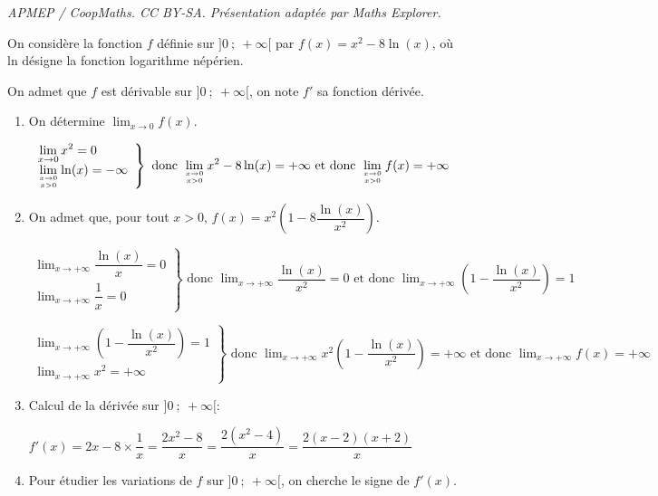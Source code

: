 \documentclass[10pt]{article}
\providecommand{\ds}{\displaystyle}
\begin{document}
\noindent\textit{APMEP / CoopMaths. CC BY-SA. Présentation adaptée par Maths Explorer.}\par\medskip
\medskip

On considère la fonction $f$ définie sur $]0~;~+\infty[$ par 
$f(x) = x^2 - 8\ln (x)$,
où ln désigne la fonction logarithme népérien.

On admet que $f$ est dérivable sur $]0~;~+\infty[$, on note $f'$ sa fonction dérivée. 

\medskip

\begin{enumerate}
\item On détermine $\displaystyle\lim_{x \to 0} f(x)$.

$\left .
\begin{array}{l}
\ds\lim_{x \to 0} x^2 =0\\
\ds\lim_{x \to 0 \atop x>0} \ln(x)=-\infty
\end{array}
\right \}
\text{ donc }
\ds\lim_{x \to 0\atop x>0} x^2 -8\ln(x)=+\infty
\text{ et donc }
\ds\lim_{x \to 0\atop x>0} f(x)=+\infty$


\item On admet que, pour tout $x > 0$,\: $f(x) = x^2\left(1 - 8\dfrac{\ln (x)}{x^2}\right)$.


$\left .
\begin{array}{l}
\ds\lim_{x \to +\infty} \dfrac{\ln(x)}{x} =0\\
\ds\lim_{x \to +\infty} \dfrac{1}{x}=0 
\end{array}
\right \}
\text{ donc }
\ds\lim_{x \to +\infty} \dfrac{\ln(x)}{x^2} =0
\text{ et donc }
\ds\lim_{x \to +\infty} \left ( 1-\dfrac{\ln(x)}{x^2}\right ) =1$

$\left .
\begin{array}{l}
\ds\lim_{x \to +\infty}  \left ( 1-\dfrac{\ln(x)}{x^2}\right ) =1\\
\ds\lim_{x \to +\infty} x^2=+\infty
\end{array}
\right \}
\text{ donc }
\ds\lim_{x \to +\infty}  x^2\left ( 1-\dfrac{\ln(x)}{x^2}\right ) =+\infty
\text{ et donc }
\ds\lim_{x \to +\infty}  f(x) =+\infty$

\item 
Calcul de la dérivée sur $]0~;~+\infty[$:

$f'(x)=2x -8\times \dfrac{1}{x}=\dfrac{2x^2-8}{x}=\dfrac{2\left (x^2-4\right )}{x}
=\dfrac{2(x-2)(x+2)}{x}$

\item Pour étudier les variations de $f$ sur $]0~;~+\infty[$, on cherche le signe de $f'(x)$.


\end{enumerate}
\end{document}
